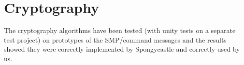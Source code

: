 \section{Cryptography}
\small{The cryptography algorithms have been tested (with unity tests on a separate test project) on prototypes of the SMP/command messages and the results showed they were correctly implemented by Spongycastle and correctly used by us.}